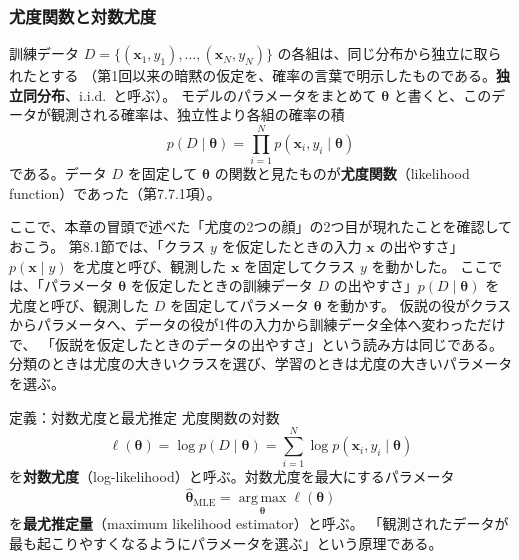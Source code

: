 \subsubsection{尤度関数と対数尤度}

訓練データ $D = \{(\bm{x}_1, y_1), \ldots, (\bm{x}_N, y_N)\}$ の各組は、同じ分布から独立に取られたとする
（第1回以来の暗黙の仮定を、確率の言葉で明示したものである。\textbf{独立同分布}、i.i.d.\ と呼ぶ）。
モデルのパラメータをまとめて $\bm{\theta}$ と書くと、このデータが観測される確率は、独立性より各組の確率の積
\begin{equation}
  p(D \mid \bm{\theta}) = \prod_{i=1}^N p(\bm{x}_i, y_i \mid \bm{\theta})
  \label{eq:ch8-lik}
\end{equation}
である。データ $D$ を固定して $\bm{\theta}$ の関数と見たものが\textbf{尤度関数}（likelihood function）であった（第7.7.1項）。

ここで、本章の冒頭で述べた「尤度の2つの顔」の2つ目が現れたことを確認しておこう。
第8.1節では、「クラス $y$ を仮定したときの入力 $\bm{x}$ の出やすさ」$p(\bm{x} \mid y)$ を尤度と呼び、観測した $\bm{x}$ を固定してクラス $y$ を動かした。
ここでは、「パラメータ $\bm{\theta}$ を仮定したときの訓練データ $D$ の出やすさ」$p(D \mid \bm{\theta})$ を尤度と呼び、観測した $D$ を固定してパラメータ $\bm{\theta}$ を動かす。
仮説の役がクラスからパラメータへ、データの役が1件の入力から訓練データ全体へ変わっただけで、
「仮説を仮定したときのデータの出やすさ」という読み方は同じである。
分類のときは尤度の大きいクラスを選び、学習のときは尤度の大きいパラメータを選ぶ。

\begin{itembox}[l]{定義：対数尤度と最尤推定}
尤度関数の対数
\begin{equation}
  \ell(\bm{\theta}) = \log p(D \mid \bm{\theta}) = \sum_{i=1}^N \log p(\bm{x}_i, y_i \mid \bm{\theta})
  \label{eq:ch8-loglik}
\end{equation}
を\textbf{対数尤度}（log-likelihood）と呼ぶ。対数尤度を最大にするパラメータ
\begin{equation}
  \hat{\bm{\theta}}_{\mathrm{MLE}} = \operatorname*{arg\,max}_{\bm{\theta}} \ell(\bm{\theta})
  \label{eq:ch8-mle}
\end{equation}
を\textbf{最尤推定量}（maximum likelihood estimator）と呼ぶ。
「観測されたデータが最も起こりやすくなるようにパラメータを選ぶ」という原理である。
\end{itembox}

